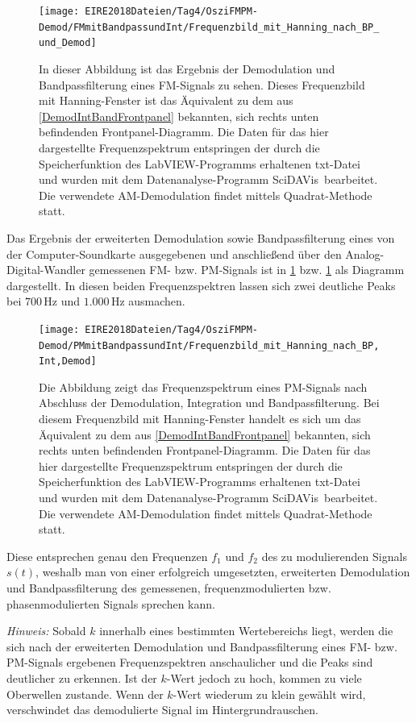 \documentclass[
a4paper,
12pt,
pagesize,
ngerman
]{scrartcl}
\begin{document}
	\begin{figure}[H] %
		\centering
		\texttt{[image: EIRE2018Dateien/Tag4/OsziFMPM-Demod/FMmitBandpassundInt/Frequenzbild\_mit\_Hanning\_nach\_BP\_und\_Demod]}
		\caption{In dieser Abbildung ist das Ergebnis der Demodulation und Bandpassfilterung eines FM-Signals zu sehen. Dieses Frequenzbild mit Hanning-Fenster ist das Äquivalent zu dem aus \cref{DemodIntBandFrontpanel} bekannten, sich rechts unten befindenden Frontpanel-Diagramm. Die Daten für das hier dargestellte Frequenzspektrum entspringen der durch die Speicherfunktion des LabVIEW-Programms erhaltenen txt-Datei und wurden mit dem Datenanalyse-Programm \glqq SciDAVis\grqq\ bearbeitet. Die verwendete AM-Demodulation findet mittels \glqq Quadrat\grqq -Methode statt.}
		\label{FMIntBandDiagramm}
	\end{figure}
	
	\noindent Das Ergebnis der erweiterten Demodulation sowie Bandpassfilterung eines von der Computer-Soundkarte ausgegebenen und anschließend über den Analog-Digital-Wandler gemessenen FM- bzw. PM-Signals ist in \cref{FMIntBandDiagramm} bzw. \cref{FMIntBandDiagramm} als Diagramm dargestellt.
	In diesen beiden Frequenzspektren lassen sich zwei deutliche Peaks bei $700\,$Hz und $1.000\,$Hz ausmachen.
	
	\begin{figure}[H] %
		\centering
		\texttt{[image: EIRE2018Dateien/Tag4/OsziFMPM-Demod/PMmitBandpassundInt/Frequenzbild\_mit\_Hanning\_nach\_BP,Int,Demod]}
		\caption{Die Abbildung zeigt das Frequenzspektrum eines PM-Signals nach Abschluss der Demodulation, Integration und Bandpassfilterung. Bei diesem Frequenzbild mit Hanning-Fenster handelt es sich um das Äquivalent zu dem aus \cref{DemodIntBandFrontpanel} bekannten, sich rechts unten befindenden Frontpanel-Diagramm. Die Daten für das hier dargestellte Frequenzspektrum entspringen der durch die Speicherfunktion des LabVIEW-Programms erhaltenen txt-Datei und wurden mit dem Datenanalyse-Programm \glqq SciDAVis\grqq\ bearbeitet. Die verwendete AM-Demodulation findet mittels \glqq Quadrat\grqq -Methode statt.}
		\label{PMIntBandDiagramm}
	\end{figure}
	
	\noindent Diese entsprechen genau den Frequenzen $f_1$ und $f_2$ des zu modulierenden Signals $s(t)$, weshalb man von einer erfolgreich umgesetzten, erweiterten Demodulation und Bandpassfilterung des gemessenen, frequenzmodulierten bzw. phasenmodulierten Signals sprechen kann.
		
	\emph{Hinweis:} Sobald $k$ innerhalb eines bestimmten Wertebereichs liegt, werden die sich nach der erweiterten Demodulation und Bandpassfilterung eines FM- bzw. PM-Signals ergebenen Frequenzspektren anschaulicher und die Peaks sind deutlicher zu erkennen.
	Ist der $k$-Wert jedoch zu hoch, kommen zu viele Oberwellen zustande.
	Wenn der $k$-Wert wiederum zu klein gewählt wird, verschwindet das demodulierte Signal im Hintergrundrauschen.
	
	
	
	\printbibliography %
	
	
\end{document}
